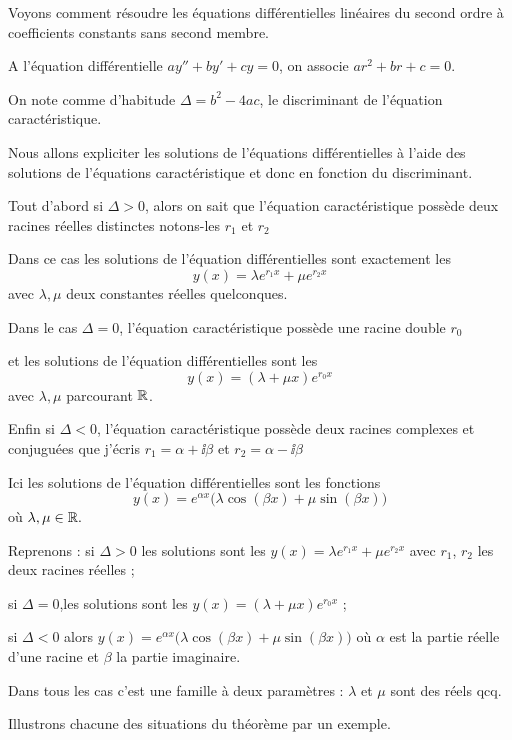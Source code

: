 Voyons comment résoudre les équations différentielles linéaires
du second ordre à  coefficients constants sans second membre.

\change
A l'équation différentielle $ay''+by'+cy=0$, on associe
 $ar^2+br+c=0$.

\change
On note comme d'habitude $\Delta= b^2-4ac$, le discriminant 
de l'équation caractéristique. 


\change
Nous allons expliciter les solutions de l'équations différentielles
à l'aide des solutions de l'équations caractéristique et donc en fonction du discriminant.

Tout d'abord si $\Delta >0$, alors on sait que 
l'équation caractéristique possède deux racines réelles distinctes 
notons-les $r_1$ et $r_2$ 

\change
Dans ce cas les solutions de l'équation différentielles sont exactement
les
$$y(x) = \lambda e^{r_1x}+ \mu e^{r_2x}$$
avec $\lambda, \mu$ deux constantes réelles quelconques.

\change
Dans le cas $\Delta=0$, 
l'équation caractéristique possède une racine double $r_0$ 

\change
et les solutions de l'équation différentielles sont les
$$y(x) = (\lambda+\mu x)e^{r_0 x}$$
avec $\lambda, \mu$ parcourant $\mathbb{R}$.


\change
Enfin si $\Delta<0$, l'équation caractéristique 
possède deux racines complexes et conjuguées que j'écris 
$r_1=\alpha+\ii \beta$ et $r_2=\alpha-\ii \beta$ 

\change
Ici les solutions de l'équation différentielles  sont les
fonctions 
$$y(x) = e^{\alpha x}\big(\lambda\cos (\beta x)+\mu\sin (\beta x)\big)$$
où $\lambda, \mu \in \mathbb{R}.$

Reprenons  :
 si $\Delta >0$ les solutions sont les 
 $y(x) = \lambda e^{r_1x}+ \mu e^{r_2x}$ avec $r_1$, $r_2$ les deux racines réelles ;
 
 si $\Delta=0$,les solutions sont les 
 $y(x) = (\lambda+\mu x)e^{r_0 x}$ ; 

 si $\Delta<0$ alors $y(x) = e^{\alpha x}\big(\lambda\cos (\beta x)+\mu\sin (\beta x)\big)$
 où $\alpha$ est la partie réelle d'une racine et $\beta$
 la partie imaginaire.
 
 Dans tous les cas c'est une famille à deux paramètres : $\lambda$ et $\mu$ sont des réels
 qcq.
 
 
\diapo

Illustrons chacune des situations du théorème par un exemple.

